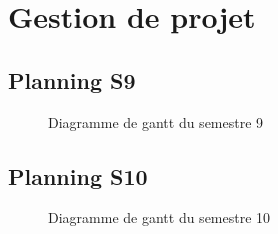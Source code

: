 \documentclass[debug,nodate,hideweeklyreports,noposter]{polytech/polytech}
\begin{document}
\chapter{Gestion de projet}
\label{ann:chap4}
\section{Planning S9}

\begin{figure}
  \caption{Diagramme de gantt du semestre 9}
  \label{fig:gantts9}
\end{figure}

\section{Planning S10}

\begin{figure}
  \caption{Diagramme de gantt du semestre 10}
  \label{fig:gantts10}
\end{figure}
\end{document}

